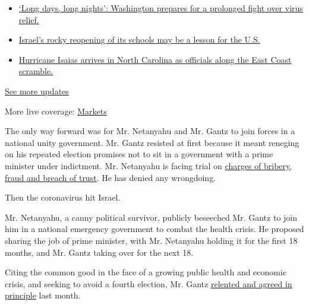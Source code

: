 \begin{itemize}
\tightlist
\item
  \href{https://www.nytimes.com/2020/08/04/world/coronavirus-covid-19.html?action=click\&pgtype=Article\&state=default\&region=MAIN_CONTENT_1\&context=storylines_live_updates\#link-6b644638}{`Long
  days, long nights': Washington prepares for a prolonged fight over
  virus relief.}
\item
  \href{https://www.nytimes.com/2020/08/04/world/coronavirus-covid-19.html?action=click\&pgtype=Article\&state=default\&region=MAIN_CONTENT_1\&context=storylines_live_updates\#link-7af9fca0}{Israel's
  rocky reopening of its schools may be a lesson for the U.S.}
\item
  \href{https://www.nytimes.com/2020/08/04/world/coronavirus-covid-19.html?action=click\&pgtype=Article\&state=default\&region=MAIN_CONTENT_1\&context=storylines_live_updates\#link-33bf9168}{Hurricane
  Isaias arrives in North Carolina as officials along the East Coast
  scramble.}
\end{itemize}

\href{https://www.nytimes.com/2020/08/04/world/coronavirus-covid-19.html?action=click\&pgtype=Article\&state=default\&region=MAIN_CONTENT_1\&context=storylines_live_updates}{See
more updates}

More live coverage:
\href{https://www.nytimes.com/live/2020/08/03/business/stock-market-today-coronavirus?action=click\&pgtype=Article\&state=default\&region=MAIN_CONTENT_1\&context=storylines_live_updates}{Markets}

The only way forward was for Mr. Netanyahu and Mr. Gantz to join forces
in a national unity government. Mr. Gantz resisted at first because it
meant reneging on his repeated election promises not to sit in a
government with a prime minister under indictment. Mr. Netanyahu is
facing trial on
\href{https://www.nytimes.com/2019/11/21/world/middleeast/netanyahu-corruption-indicted.html}{charges
of bribery, fraud and breach of trust}. He has denied any wrongdoing.

Then the coronavirus hit Israel.

Mr. Netanyahu, a canny political survivor, publicly beseeched Mr. Gantz
to join him in a national emergency government to combat the health
crisis. He proposed sharing the job of prime minister, with Mr.
Netanyahu holding it for the first 18 months, and Mr. Gantz taking over
for the next 18.

Citing the common good in the face of a growing public health and
economic crisis, and seeking to avoid a fourth election, Mr. Gantz
\href{https://www.nytimes.com/2020/03/26/world/middleeast/israel-netanyahu-gantz-government.html}{relented
and agreed in principle} last month.

